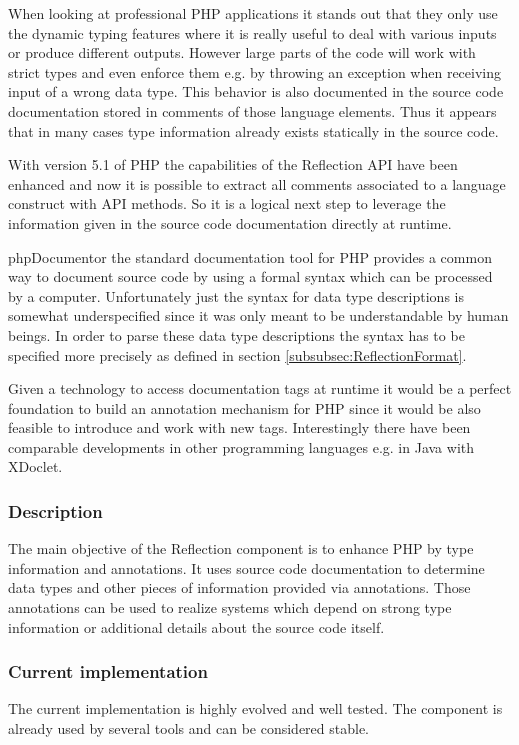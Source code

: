 \documentclass[10pt,final,a4paper,oneside]{article}
\begin{document}
When looking at professional PHP applications
it stands out that they only use the dynamic
typing features 
where it is really useful to deal with various inputs
or produce different outputs.
However large parts of the code will work with strict
types and even enforce them e.g. by throwing
an exception when receiving input of a wrong data type.
This behavior is also documented in the source code
documentation stored in comments of those language elements.
Thus it appears that in many cases type information
already exists statically in the source code.

With version 5.1 of PHP the capabilities of the Reflection API
have been enhanced and now it is possible to extract all comments
associated to a language construct with API methods.
So it is a logical next step to leverage the information
given in the source code documentation directly at runtime.

phpDocumentor \cite{phpDocumentor} the standard documentation tool for PHP
provides a common way to document source code by
using a formal syntax which can be processed by a computer.
Unfortunately just the syntax for data type descriptions
is somewhat underspecified since it was only meant
to be understandable by human beings.
In order to parse these data type descriptions
the syntax has to be specified more precisely
as defined in section \ref{subsubsec:ReflectionFormat}.

Given a technology to access documentation tags
at runtime it would be a perfect foundation
to build an annotation mechanism for PHP
since it would be also feasible to introduce and work with new tags.
Interestingly there have been comparable developments in other
programming languages e.g. in Java with XDoclet.


\subsubsection{Description}
The main objective of the Reflection component is
to enhance PHP by type information and annotations.
It uses source code documentation to determine
data types and other pieces of information provided
via annotations.
Those annotations can be used to realize systems
which depend on strong type information or
additional details about the source code itself.


\subsubsection{Current implementation}
The current implementation is highly evolved and well tested.
The component is already used by several tools
and can be considered stable.
\end{document}
